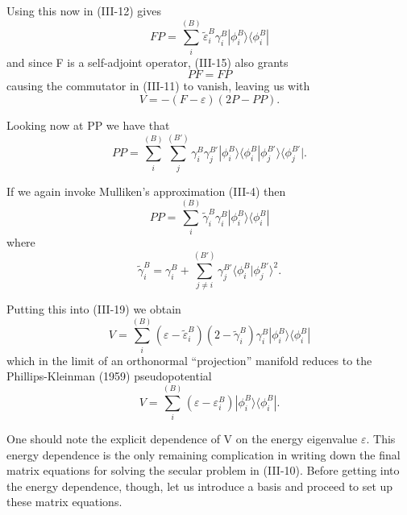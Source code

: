 \documentclass[12pt,letterpaper]{report}
\begin{document}
Using this now in (III-12) gives
\begin{equation}
FP = \sum_i^{(B)} \tilde{\varepsilon}_i^B \gamma_i^B |\phi_i^B \rangle \langle \phi_i^B|
\end{equation}
and since F is a self-adjoint operator, (III-15) also grants
\begin{equation}
PF = FP
\end{equation}
causing the commutator in (III-11) to vanish, leaving us with
\begin{equation}
V = -(F - \varepsilon)(2P - PP).
\end{equation}

Looking now at PP we have that
\begin{equation}
PP = \sum_i^{(B)} \sum_j^{(B')} \gamma_i^B \gamma_j^{B'} |\phi_i^B \rangle \langle \phi_i^B | \phi_j^{B'} \rangle \langle \phi_j^{B'}|.
\end{equation}

If we again invoke Mulliken's approximation (III-4) then
\begin{equation}
PP = \sum_i^{(B)} \tilde{\gamma}_i^B \gamma_i^B |\phi_i^B \rangle \langle \phi_i^B|
\end{equation}
where
\begin{equation}
\tilde{\gamma}_i^B = \gamma_i^B + \sum_{j \neq i}^{(B')} \gamma_j^{B'} \langle \phi_i^B | \phi_j^{B'} \rangle^2.
\end{equation}

Putting this into (III-19) we obtain
\begin{equation}
V = \sum_i^{(B)} (\varepsilon - \tilde{\varepsilon}_i^B)(2 - \tilde{\gamma}_i^B)\gamma_i^B |\phi_i^B \rangle \langle \phi_i^B|
\end{equation}
which in the limit of an orthonormal ``projection'' manifold reduces to the Phillips-Kleinman (1959) pseudopotential
\begin{equation}
V = \sum_i^{(B)} (\varepsilon - \varepsilon_i^B) |\phi_i^B \rangle \langle \phi_i^B|.
\end{equation}

One should note the explicit dependence of V on the energy eigenvalue $\varepsilon$. This energy dependence is the only remaining complication in writing down the final matrix equations for solving the secular problem in (III-10). Before getting into the energy dependence, though, let us introduce a basis and proceed to set up these matrix equations.
\end{document}
